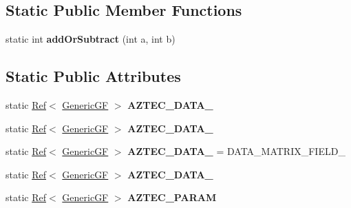 \subsection*{Static Public Member Functions}
\begin{DoxyCompactItemize}
\item 
\mbox{\label{classzxing_1_1_generic_g_f_a7bccbf08b29957a72d07be313203d14c}} 
static int {\bfseries add\+Or\+Subtract} (int a, int b)
\end{DoxyCompactItemize}
\subsection*{Static Public Attributes}
\begin{DoxyCompactItemize}
\item 
\mbox{\label{classzxing_1_1_generic_g_f_a83618b23cfe278ff20c3441cd379f667}} 
static \mbox{\hyperlink{classzxing_1_1_ref}{Ref}}$<$ \mbox{\hyperlink{classzxing_1_1_generic_g_f}{Generic\+GF}} $>$ {\bfseries A\+Z\+T\+E\+C\+\_\+\+D\+A\+T\+A\+\_}
\item 
\mbox{\label{classzxing_1_1_generic_g_f_a1c9b9d73c183280155af2115d51ba1bf}} 
static \mbox{\hyperlink{classzxing_1_1_ref}{Ref}}$<$ \mbox{\hyperlink{classzxing_1_1_generic_g_f}{Generic\+GF}} $>$ {\bfseries A\+Z\+T\+E\+C\+\_\+\+D\+A\+T\+A\+\_}
\item 
\mbox{\label{classzxing_1_1_generic_g_f_a0d0fb24043661ad4b25fb0b56a16fd24}} 
static \mbox{\hyperlink{classzxing_1_1_ref}{Ref}}$<$ \mbox{\hyperlink{classzxing_1_1_generic_g_f}{Generic\+GF}} $>$ {\bfseries A\+Z\+T\+E\+C\+\_\+\+D\+A\+T\+A\+\_} = D\+A\+T\+A\+\_\+\+M\+A\+T\+R\+I\+X\+\_\+\+F\+I\+E\+L\+D\+\_
\item 
\mbox{\label{classzxing_1_1_generic_g_f_a6fa96e14485a06516a5a6f007ed0c74b}} 
static \mbox{\hyperlink{classzxing_1_1_ref}{Ref}}$<$ \mbox{\hyperlink{classzxing_1_1_generic_g_f}{Generic\+GF}} $>$ {\bfseries A\+Z\+T\+E\+C\+\_\+\+D\+A\+T\+A\+\_}
\item 
\mbox{\label{classzxing_1_1_generic_g_f_ae89ac67f600d189d9f43a58c2ec824df}} 
static \mbox{\hyperlink{classzxing_1_1_ref}{Ref}}$<$ \mbox{\hyperlink{classzxing_1_1_generic_g_f}{Generic\+GF}} $>$ {\bfseries A\+Z\+T\+E\+C\+\_\+\+P\+A\+R\+AM}

\end{DoxyCompactItemize}
